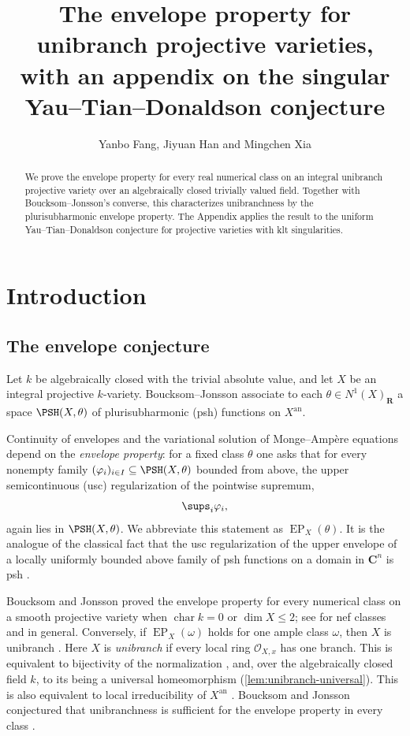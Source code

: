 \documentclass[11pt,a4paper]{article}
\title{The envelope property for unibranch projective varieties,\\
\large with an appendix on the singular Yau--Tian--Donaldson conjecture}
\author{Yanbo Fang, Jiyuan Han and Mingchen Xia}
\date{}
\newcommand{\an}{\mathrm{an}}          %
\newcommand{\EP}{\operatorname{EP}}
\begin{document}
\maketitle


\begin{abstract}
We prove the envelope property for every real numerical class on an integral unibranch projective variety over an algebraically closed trivially valued field. Together with Boucksom--Jonsson's converse, this characterizes unibranchness by the plurisubharmonic envelope property. The Appendix applies the result to the uniform Yau--Tian--Donaldson conjecture for projective varieties with klt singularities.
\end{abstract}
\section{Introduction}

\subsection{The envelope conjecture}

Let $k$ be algebraically closed with the trivial absolute value, and let $X$ be an integral projective $k$-variety. Boucksom--Jonsson \cite{BJ22} associate to each $\theta\in N^1(X)_{\mathbf R}$ a space $\PSH(X,\theta)$ of plurisubharmonic (psh) functions on $X^{\an}$.

Continuity of envelopes and the variational solution of Monge--Amp\`ere equations depend on the \emph{envelope property}: for a fixed class $\theta$ one asks that for every nonempty family $(\varphi_i)_{i\in I}\subseteq\PSH(X,\theta)$ bounded from above, the upper semicontinuous (usc) regularization of the pointwise supremum,
\[
  \sups_i\varphi_i,
\]
again lies in $\PSH(X,\theta)$.  We abbreviate this statement as $\EP_X(\theta)$.  It is the analogue of the classical fact that the usc regularization of the upper envelope of a locally uniformly bounded above family of psh functions on a domain in $\mathbf C^n$ is psh \cite{Lel68}.

Boucksom and Jonsson proved the envelope property for every numerical class on a smooth projective variety when $\operatorname{char}k=0$ or $\dim X\leq2$; see \cite[Theorem~5.20]{BJ22} for nef classes and \cite[Theorem~A]{BJaddendum} in general. Conversely, if $\EP_X(\omega)$ holds for one ample class $\omega$, then $X$ is unibranch \cite[Theorem~5.12]{BJ22}. Here $X$ is \emph{unibranch} if every local ring $\mathcal O_{X,x}$ has one branch. This is equivalent to bijectivity of the normalization \cite[\href{https://stacks.math.columbia.edu/tag/0C37}{Tag 0C37} and \href{https://stacks.math.columbia.edu/tag/0C3B}{Tag 0C3B}]{Stacks}, and, over the algebraically closed field $k$, to its being a universal homeomorphism (\cref{lem:unibranch-universal}). This is also equivalent to local irreducibility of $X^{\an}$ \cite[\S5.2]{BJ22}. Boucksom and Jonsson conjectured that unibranchness is sufficient for the envelope property in every class \cite[Conjecture~5.14]{BJ22}.
\end{document}
